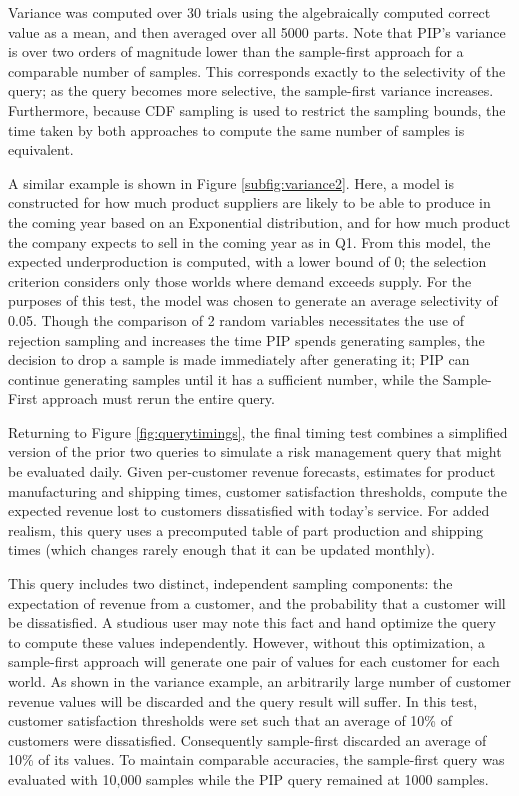 Variance was computed over 30 trials using the algebraically computed correct value as a mean, and then averaged over all 5000 parts.  Note that PIP's variance is over two orders of magnitude lower than the sample-first approach for a comparable number of samples.  This corresponds exactly to the selectivity of the query; as the query becomes more selective, the sample-first variance increases.  Furthermore, because CDF sampling is used to restrict the sampling bounds, the time taken by both approaches to compute the same number of samples is equivalent.

A similar example is shown in Figure \ref{subfig:variance2}.  Here, a model is constructed for how much product suppliers are likely to be able to produce in the coming year based on an Exponential distribution, and for how much product the company expects to sell in the coming year as in Q1.  From this model, the expected underproduction is computed, with a lower bound of 0; the selection criterion considers only those worlds where demand exceeds supply.  For the purposes of this test, the model was chosen to generate an average selectivity of 0.05.  Though the comparison of 2 random variables necessitates the use of rejection sampling and increases the time PIP spends generating samples, the decision to drop a sample is made immediately after generating it; PIP can continue generating samples until it has a sufficient number, while the Sample-First approach must rerun the entire query.

Returning to Figure \ref{fig:querytimings}, the final timing test combines a simplified version of the prior two queries to simulate a risk management query that might be evaluated daily.  Given per-customer revenue forecasts, estimates for product manufacturing and shipping times, customer satisfaction thresholds, compute the expected revenue lost to customers dissatisfied with today's service.  For added realism, this query uses a precomputed table of part production and shipping times (which changes rarely enough that it can be updated monthly).  %

This query includes two distinct, independent sampling components: the expectation of revenue from a customer, and the probability that a customer will be dissatisfied.  A studious user may note this fact and hand optimize the query to compute these values independently.  However, without this optimization, a sample-first approach will generate one pair of values for each customer for each world.  As shown in the variance example, an arbitrarily large number of customer revenue values will be discarded and the query result will suffer.  In this test, customer satisfaction thresholds were set such that an average of 10\% of customers were dissatisfied.  Consequently sample-first discarded an average of 10\% of its values.  To maintain comparable accuracies, the sample-first query was evaluated with 10,000 samples while the PIP query remained at 1000 samples. 

